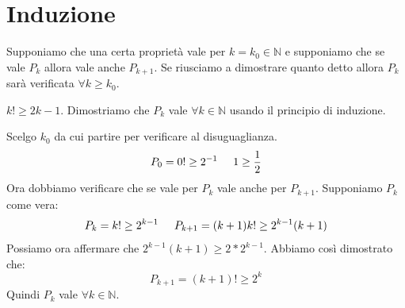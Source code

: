 \chapter{Induzione}

Supponiamo che una certa proprietà vale per $k=k_0\in\mathbb{N}$ e supponiamo che se vale $P_k$ allora vale anche $P_{k+1}$. Se riusciamo a dimostrare quanto detto allora $P_k$ sarà verificata $\forall k\geq k_0$.
\begin{example}
    $k!\geq 2{k-1}$.
    Dimostriamo che $P_k$ vale $\forall k\in\mathbb{N}$ usando il principio di induzione.
    
    Scelgo $k_0$ da cui partire per verificare al disuguaglianza.
    \begin{equation*}
        P_0=0!\geq 2^{-1}\hspace{0,5cm}1\geq \frac{1}{2}    
    \end{equation*}
    Ora dobbiamo verificare che se vale per $P_k$ vale anche per $P_{k+1}$. Supponiamo $P_k$ come vera:
    \begin{equation*}
        P_k=k!\geq 2^{k-1}\hspace{0,5cm}P_{k+1}=(k+1)k!\geq 2^{k-1}(k+1)
    \end{equation*}
    Possiamo ora affermare che $2^{k-1}(k+1)\geq 2*2^{k-1}$. Abbiamo così dimostrato che:
    \begin{equation*}
        P_{k+1}=(k+1)!\geq 2^k
    \end{equation*}
    Quindi $P_k$ vale $\forall k\in\mathbb{N}$.
\end{example}
